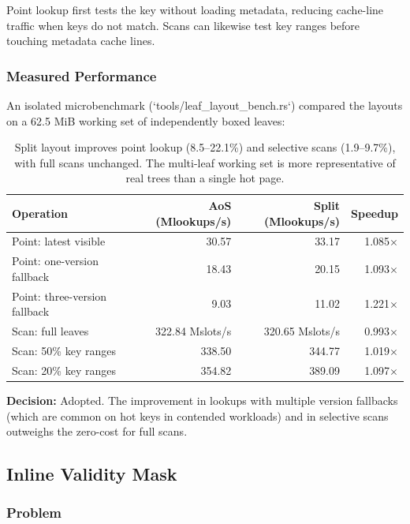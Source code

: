 \documentclass[11pt]{article}
\begin{document}
Point lookup first tests the key without loading metadata, reducing cache-line traffic when
keys do not match. Scans can likewise test key ranges before touching metadata cache lines.

\subsubsection{Measured Performance}

An isolated microbenchmark (`tools/leaf_layout_bench.rs`) compared the layouts on a 62.5 MiB
working set of independently boxed leaves:

\begin{table}[h]
\centering
\small
\begin{tabular}{lrrr}
\toprule
\textbf{Operation} & \textbf{AoS (Mlookups/s)} & \textbf{Split (Mlookups/s)} & \textbf{Speedup} \\
\midrule
Point: latest visible & 30.57 & 33.17 & 1.085$\times$ \\
Point: one-version fallback & 18.43 & 20.15 & 1.093$\times$ \\
Point: three-version fallback & 9.03 & 11.02 & 1.221$\times$ \\
Scan: full leaves & 322.84 Mslots/s & 320.65 Mslots/s & 0.993$\times$ \\
Scan: 50\% key ranges & 338.50 & 344.77 & 1.019$\times$ \\
Scan: 20\% key ranges & 354.82 & 389.09 & 1.097$\times$ \\
\bottomrule
\end{tabular}
\caption{Split layout improves point lookup (8.5--22.1\%) and selective scans (1.9--9.7\%),
with full scans unchanged. The multi-leaf working set is more representative of real trees
than a single hot page.}
\label{tab:leaf_layout}
\end{table}

\textbf{Decision:} Adopted. The improvement in lookups with multiple version fallbacks
(which are common on hot keys in contended workloads) and in selective scans outweighs the
zero-cost for full scans.

\subsection{Inline Validity Mask}

\subsubsection{Problem}
\end{document}
